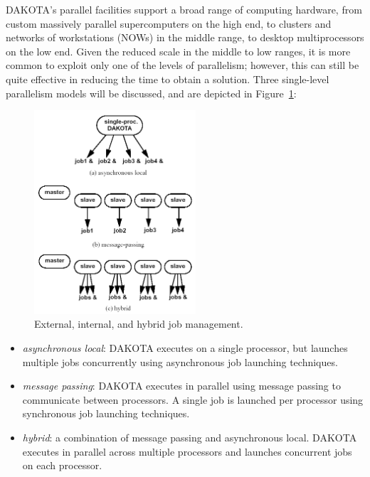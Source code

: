 DAKOTA's parallel facilities support a broad range of computing
hardware, from custom massively parallel supercomputers on the high
end, to clusters and networks of workstations (NOWs) in the middle
range, to desktop multiprocessors on the low end. Given the reduced
scale in the middle to low ranges, it is more common to exploit only
one of the levels of parallelism; however, this can still be quite
effective in reducing the time to obtain a solution.  Three
single-level parallelism models will be discussed, and are depicted
in Figure~\ref{parallel:figure03}:

\begin{figure}
  \includegraphics[width=60mm]{images/ex_in_hy_job_management}
  \caption{External, internal, and hybrid job management.}
  \label{parallel:figure03}
\end{figure}

\begin{itemize}
\item \emph{asynchronous local}: DAKOTA executes on a single processor,
but launches multiple jobs concurrently using asynchronous job launching
techniques.

\item \emph{message passing}: DAKOTA executes in parallel using message
passing to communicate between processors.  A single job is launched
per processor using synchronous job launching techniques.

\item \emph{hybrid}: a combination of message passing and asynchronous
local.  DAKOTA executes in parallel across multiple processors and
launches concurrent jobs on each processor.
\end{itemize}

